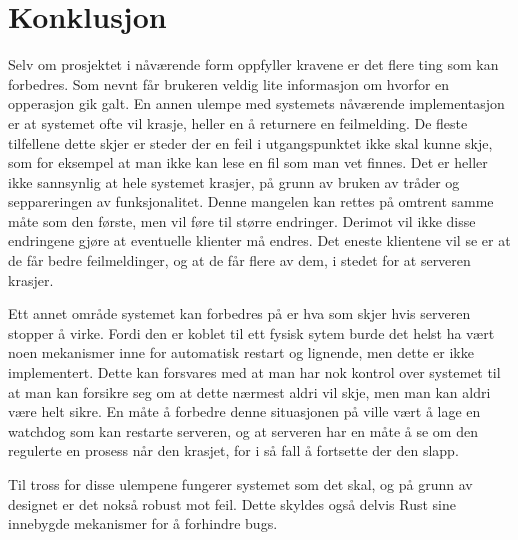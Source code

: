 \section{Konklusjon}

Selv om prosjektet i nåværende form oppfyller kravene er det flere ting som kan forbedres. Som nevnt får brukeren veldig lite informasjon om hvorfor en opperasjon gik galt. En annen ulempe med systemets nåværende implementasjon er at systemet ofte vil krasje, heller en å returnere en feilmelding. De fleste tilfellene dette skjer er steder der en feil i utgangspunktet ikke skal kunne skje, som for eksempel at man ikke kan lese en fil som man vet finnes. Det er heller ikke sannsynlig at hele systemet krasjer, på grunn av bruken av tråder og seppareringen av funksjonalitet. Denne mangelen kan rettes på omtrent samme måte som den første, men vil føre til større endringer. Derimot vil ikke disse endringene gjøre at eventuelle klienter må endres. Det eneste klientene vil se er at de får bedre feilmeldinger, og at de får flere av dem, i stedet for at serveren krasjer. 

Ett annet område systemet kan forbedres på er hva som skjer hvis serveren stopper å virke. Fordi den er koblet til ett fysisk sytem burde det helst ha vært noen mekanismer inne for automatisk restart og lignende, men dette er ikke implementert. Dette kan forsvares med at man har nok kontrol over systemet til at man kan forsikre seg om at dette nærmest aldri vil skje, men man kan aldri være helt sikre. En måte å forbedre denne situasjonen på ville vært å lage en watchdog som kan restarte serveren, og at serveren har en måte å se om den regulerte en prosess når den krasjet, for i så fall å fortsette der den slapp. 

Til tross for disse ulempene fungerer systemet som det skal, og på grunn av designet er det nokså robust mot feil. Dette skyldes også delvis Rust sine innebygde mekanismer for å forhindre bugs. 